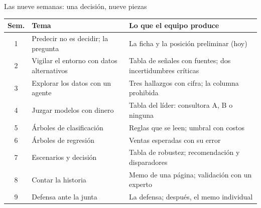 \documentclass{beamer}
\begin{document}
\begin{frame}{Las nueve semanas: una decisión, nueve piezas}
\small
\begin{tabular}{@{}c p{} p{}@{}}
\toprule
Sem. & Tema & Lo que el equipo produce \\
\midrule
1 & Predecir no es decidir; la pregunta & La ficha y la posición preliminar (hoy) \\
2 & Vigilar el entorno con datos alternativos & Tabla de señales con fuentes; dos incertidumbres críticas \\
3 & Explorar los datos con un agente & Tres hallazgos con cifra; la columna prohibida \\
4 & Juzgar modelos con dinero & Tabla del líder: consultora A, B o ninguna \\
5 & Árboles de clasificación & Reglas que se leen; umbral con costos \\
6 & Árboles de regresión & Ventas esperadas con su error \\
7 & Escenarios y decisión & Tabla de robustez; recomendación y disparadores \\
8 & Contar la historia & Memo de una página; validación con un experto \\
9 & Defensa ante la junta & La defensa; después, el memo individual \\
\bottomrule
\end{tabular}
\end{frame}
\end{document}
